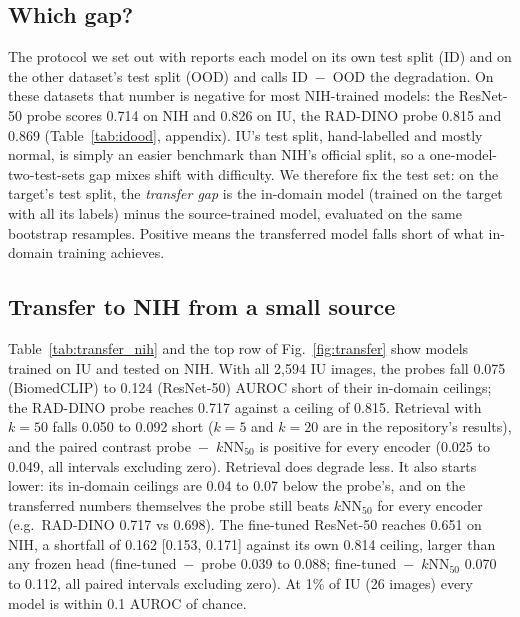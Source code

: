 \documentclass[conference]{IEEEtran}
\begin{document}
\subsection{Which gap?}
\label{sec:gapdef}
The protocol we set out with reports each model on its own test split (ID) and on the other dataset's test split (OOD) and calls ID~$-$~OOD the degradation. On these datasets that number is negative for most NIH-trained models: the ResNet-50 probe scores 0.714 on NIH and 0.826 on IU, the RAD-DINO probe 0.815 and 0.869 (Table~\ref{tab:idood}, appendix). IU's test split, hand-labelled and mostly normal, is simply an easier benchmark than NIH's official split, so a one-model-two-test-sets gap mixes shift with difficulty. We therefore fix the test set: on the target's test split, the \emph{transfer gap} is the in-domain model (trained on the target with all its labels) minus the source-trained model, evaluated on the same bootstrap resamples. Positive means the transferred model falls short of what in-domain training achieves.

\begin{table}[!t]
  \caption{NIH test split, models trained on IU: transferred macro AUROC with, in parentheses, the gap to the in-domain ceiling (a model trained on NIH with all its labels) and, below it, the paired 95\% interval.}
  \label{tab:transfer_nih}
  \centering
  
\end{table}

\begin{table}[!t]
  \caption{IU test split, models trained on NIH, as in Table~\ref{tab:transfer_nih}; column headers give the number of source training images.}
  \label{tab:transfer_iu}
  \centering
  
\end{table}

\subsection{Transfer to NIH from a small source}
Table~\ref{tab:transfer_nih} and the top row of Fig.~\ref{fig:transfer} show models trained on IU and tested on NIH. With all 2,594 IU images, the probes fall 0.075 (BiomedCLIP) to 0.124 (ResNet-50) AUROC short of their in-domain ceilings; the RAD-DINO probe reaches 0.717 against a ceiling of 0.815. Retrieval with $k=50$ falls 0.050 to 0.092 short ($k=5$ and $k=20$ are in the repository's results), and the paired contrast probe~$-$~$k$NN$_{50}$ is positive for every encoder (0.025 to 0.049, all intervals excluding zero). Retrieval does degrade less. It also starts lower: its in-domain ceilings are 0.04 to 0.07 below the probe's, and on the transferred numbers themselves the probe still beats $k$NN$_{50}$ for every encoder (e.g.\ RAD-DINO 0.717 vs 0.698). The fine-tuned ResNet-50 reaches 0.651 on NIH, a shortfall of 0.162 [0.153, 0.171] against its own 0.814 ceiling, larger than any frozen head (fine-tuned~$-$~probe 0.039 to 0.088; fine-tuned~$-$~$k$NN$_{50}$ 0.070 to 0.112, all paired intervals excluding zero). At 1\% of IU (26 images) every model is within 0.1 AUROC of chance.
\end{document}
